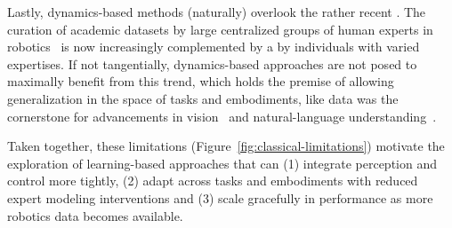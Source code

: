 Lastly, dynamics-based methods (naturally) overlook the rather recent . 
The curation of academic datasets by large centralized groups of human experts in robotics~\citep{OpenXEmbodimentRobotic,DROIDLargeScaleIntheWild,agibot-world-contributorsAgiBotWorldColosseo2025} is now increasingly complemented by a  by individuals with varied expertises.
If not tangentially, dynamics-based approaches are not posed to maximally benefit from this trend, which holds the premise of allowing generalization in the space of tasks and embodiments, like data was the cornerstone for advancements in vision~\citep{alayracFlamingoVisualLanguage2022} and natural-language understanding~\citep{brownLanguageModelsAre2020}.

Taken together, these limitations (Figure~\ref{fig:classical-limitations}) motivate the exploration of learning-based approaches that can (1) integrate perception and control more tightly, (2) adapt across tasks and embodiments with reduced expert modeling interventions and (3) scale gracefully in performance as more robotics data becomes available.